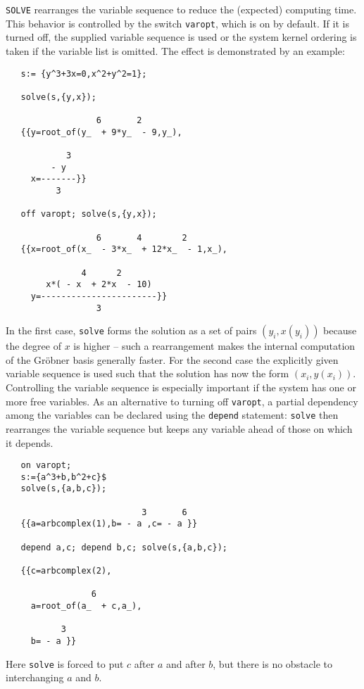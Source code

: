 {\tt SOLVE} rearranges the variable sequence
to reduce the (expected) computing time. This behavior is controlled
by the switch {\tt varopt}, which is on by default.
If it is turned off, the supplied variable sequence is used
or the system kernel ordering is taken if the variable
list is omitted. The effect is demonstrated by an example:
\begin{verbatim}
   s:= {y^3+3x=0,x^2+y^2=1};

   solve(s,{y,x});

                  6       2
   {{y=root_of(y_  + 9*y_  - 9,y_),

            3
         - y
     x=-------}}
          3

   off varopt; solve(s,{y,x});

                  6       4        2
   {{x=root_of(x_  - 3*x_  + 12*x_  - 1,x_),

               4      2
        x*( - x  + 2*x  - 10)
     y=-----------------------}}
                  3

\end{verbatim}
In the first case, {\tt solve} forms the solution as a set of
pairs $(y_i,x(y_i))$ because the degree of $x$ is higher --
such a rearrangement makes the internal computation of the Gr\"obner basis
generally faster. For the second case the explicitly given variable sequence
is used such that the solution has now the form $(x_i,y(x_i))$.
Controlling the variable sequence is especially important if
the system has one or more free variables.
As an alternative to turning off {\tt varopt}, a partial dependency among
the variables can be declared using the {\tt depend}
statement: {\tt solve} then rearranges the variable sequence but keeps any
variable ahead of those on which it depends.
\begin{verbatim}
   on varopt;
   s:={a^3+b,b^2+c}$
   solve(s,{a,b,c});

                           3       6
   {{a=arbcomplex(1),b= - a ,c= - a }}

   depend a,c; depend b,c; solve(s,{a,b,c});

   {{c=arbcomplex(2),

                 6
     a=root_of(a_  + c,a_),

           3
     b= - a }}
\end{verbatim}
Here {\tt solve} is forced to put $c$ after $a$ and after $b$, but
there is no obstacle to interchanging $a$ and $b$.

